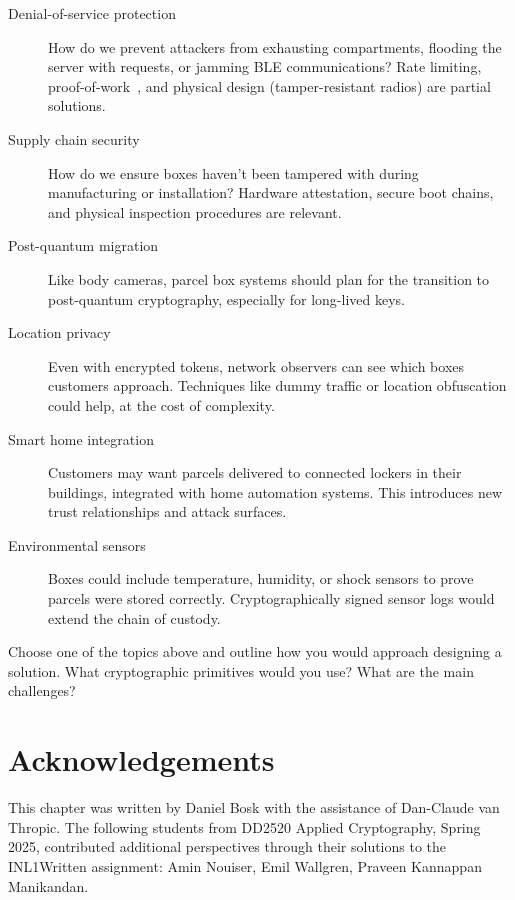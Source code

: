 \begin{description}
  \item[Denial-of-service protection] How do we prevent attackers from 
    exhausting compartments, flooding the server with requests, or jamming BLE 
    communications?
    Rate limiting, proof-of-work~\autocite{DworkNaor1992pow}, and physical
    design (tamper-resistant radios) are partial solutions.
  \item[Supply chain security] How do we ensure boxes haven't been tampered 
    with during manufacturing or installation?
    Hardware attestation, secure boot chains, and physical inspection 
    procedures are relevant.
  \item[Post-quantum migration] Like body cameras, parcel box systems should 
    plan for the transition to post-quantum cryptography, especially for 
    long-lived keys.
  \item[Location privacy] Even with encrypted tokens, network observers can see 
    which boxes customers approach.
    Techniques like dummy traffic or location obfuscation could help, at the 
    cost of complexity.
  \item[Smart home integration] Customers may want parcels delivered to 
    connected lockers in their buildings, integrated with home automation 
    systems.
    This introduces new trust relationships and attack surfaces.
  \item[Environmental sensors] Boxes could include temperature, humidity, or 
    shock sensors to prove parcels were stored correctly.
    Cryptographically signed sensor logs would extend the chain of custody.
\end{description}

\begin{exercise}
  Choose one of the topics above and outline how you would approach designing a 
  solution.
  What cryptographic primitives would you use?
  What are the main challenges?
\end{exercise}


\section*{Acknowledgements}

This chapter was written by Daniel Bosk with the assistance of Dan-Claude van 
Thropic.
The following students from DD2520 Applied Cryptography, Spring 2025, 
contributed additional perspectives through their solutions to the INL1Written 
assignment:
Amin Nouiser,
Emil Wallgren,
Praveen Kannappan Manikandan.
